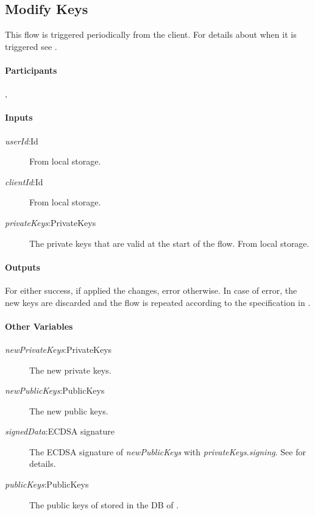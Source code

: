 \documentclass[a4paper,10pt]{article}
\newcommand{\signedData}{\emph{signedData}}
\newcommand{\newPublicKeys}{\emph{newPublicKeys}}
\newcommand{\newPrivateKeys}{\emph{newPrivateKeys}}
\newcommand{\privateKeys}{\emph{privateKeys}}
\newcommand{\publicKeys}{\emph{publicKeys}}
\newcommand{\signingKey}{\privateKeys{}.\emph{signing}}
\newcommand{\userId}{\emph{userId}}
\newcommand{\clientId}{\emph{clientId}}
\begin{document}
\subsection{Modify Keys}
\label{modify_keys_flow}
This flow is triggered periodically from the client. For details about when it is triggered see \cite{crypto_spec}.

\paragraph{Participants} \Client{}, \Server{}

\paragraph{Inputs}
\SpecialItem
\begin{description}
 \item[\userId{}:Id] From \Client{} local storage.
 \item[\clientId{}:Id] From \Client{} local storage.
 \item[\privateKeys{}:PrivateKeys] The private keys that are valid at the start of the flow. From \Client{} local storage.
\end{description}

\paragraph{Outputs}
For \Client{} either success, if \Server{} applied the changes, error otherwise. In case of error, the new keys are discarded and the flow is repeated according to the 
specification in \cite{crypto_spec}.

\paragraph{Other Variables}
\SpecialItem
\begin{description}
 \item[\newPrivateKeys{}:PrivateKeys] The new private keys.
 \item[\newPublicKeys{}:PublicKeys] The new public keys.
 \item[\signedData{}:ECDSA signature] The ECDSA signature of \newPublicKeys{} with \signingKey{}. See \cite{crypto_spec} for details.
 \item[\publicKeys{}:PublicKeys] The public keys of \Client{} stored in the DB of \Server{}.
\end{description}
\end{document}
